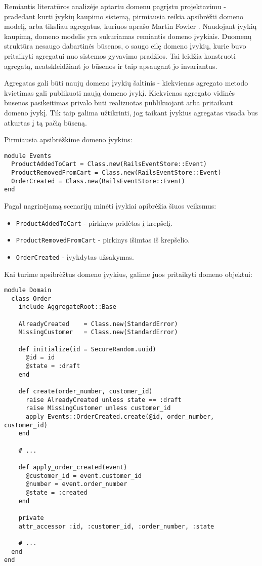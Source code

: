 Remiantis literatūros analizėje aptartu domenu pagrįstu projektavimu - pradedant kurti įvykių kaupimo sistemą, pirmiausia reikia apsibrėžti domeno modelį, arba tiksliau agregatus, kuriuos aprašo Martin Fowler \cite{Fowler:Aggregate}. Naudojant įvykių kaupimą, domeno modelis yra sukuriamas remiantis domeno įvykiais. Duomenų struktūra nesaugo dabartinės būsenos, o saugo eilę domeno įvykių, kurie buvo pritaikyti agregatui nuo sistemos gyvavimo pradžios. Tai leidžia konstruoti agregatą, neatskleidžiant jo būsenos ir taip apsaugant jo invariantus.

Agregatas gali būti naujų domeno įvykių šaltinis - kiekvienas agregato metodo kvietimas gali publikuoti naują domeno įvykį. Kiekvienas agregato vidinės būsenos pasikeitimas privalo būti realizuotas publikuojant arba pritaikant domeno įvykį. Tik taip galima užtikrinti, jog taikant įvykius agregatas visada bus atkurtas į tą pačią būseną.

Pirmiausia apsibrėžkime domeno įvykius:

\begin{lstlisting}[]
module Events
  ProductAddedToCart = Class.new(RailsEventStore::Event)
  ProductRemovedFromCart = Class.new(RailsEventStore::Event)
  OrderCreated = Class.new(RailsEventStore::Event)
end
\end{lstlisting}

Pagal nagrinėjamą scenarijų minėti įvykiai apibrėžia šiuos veiksmus:

\begin{itemize}
  \item \lstinline|ProductAddedToCart| - pirkinys pridėtas į krepšelį.
  \item \lstinline|ProductRemovedFromCart| - pirkinys išimtas iš krepšelio.
  \item \lstinline|OrderCreated| - įvykdytas užsakymas.
\end{itemize}

Kai turime apsibrėžtus domeno įvykius, galime juos pritaikyti domeno objektui:

\begin{lstlisting}
module Domain
  class Order
    include AggregateRoot::Base

    AlreadyCreated    = Class.new(StandardError)
    MissingCustomer   = Class.new(StandardError)

    def initialize(id = SecureRandom.uuid)
      @id = id
      @state = :draft
    end

    def create(order_number, customer_id)
      raise AlreadyCreated unless state == :draft
      raise MissingCustomer unless customer_id
      apply Events::OrderCreated.create(@id, order_number, customer_id)
    end

    # ...

    def apply_order_created(event)
      @customer_id = event.customer_id
      @number = event.order_number
      @state = :created
    end

    private
    attr_accessor :id, :customer_id, :order_number, :state

    # ...
  end
end
\end{lstlisting}

